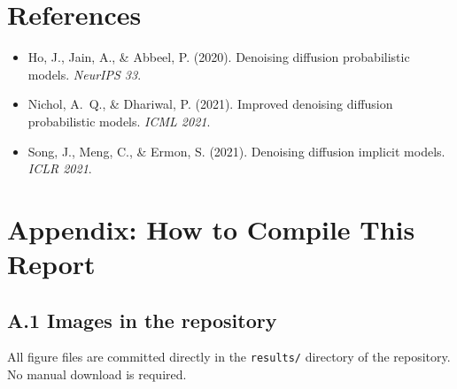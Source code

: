 \documentclass[11pt,a4paper]{article}
\begin{document}
\section*{References}

\begin{itemize}[leftmargin=1.8em, label={}]
  \item Ho, J., Jain, A., \& Abbeel, P. (2020). Denoising diffusion
        probabilistic models. \textit{NeurIPS 33}.
  \item Nichol, A.~Q., \& Dhariwal, P. (2021). Improved denoising diffusion
        probabilistic models. \textit{ICML 2021}.
  \item Song, J., Meng, C., \& Ermon, S. (2021). Denoising diffusion implicit
        models. \textit{ICLR 2021}.
\end{itemize}

\newpage
\appendix
\section*{Appendix: How to Compile This Report}

\subsection*{A.1 Images in the repository}

All figure files are committed directly in the \texttt{results/} directory
of the repository.  No manual download is required.
\end{document}
